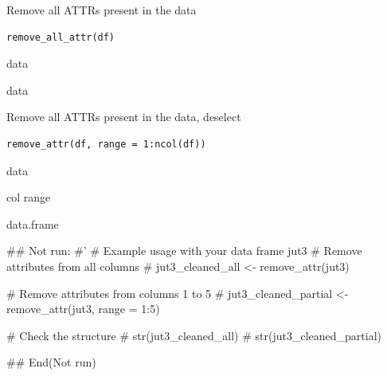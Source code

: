 \documentclass[a4paper]{book}
\begin{document}
%
\begin{Description}
Remove all ATTRs present in the data
\end{Description}
%
\begin{Usage}
\begin{verbatim}
remove_all_attr(df)
\end{verbatim}
\end{Usage}
%
\begin{Arguments}
\begin{ldescription}
\item[\code{df}] data
\end{ldescription}
\end{Arguments}
%
\begin{Value}
data
\end{Value}
%
\begin{Description}
Remove all ATTRs present in the data, deselect
\end{Description}
%
\begin{Usage}
\begin{verbatim}
remove_attr(df, range = 1:ncol(df))
\end{verbatim}
\end{Usage}
%
\begin{Arguments}
\begin{ldescription}
\item[\code{df}] data

\item[\code{range}] col range
\end{ldescription}
\end{Arguments}
%
\begin{Value}
data.frame
\end{Value}
%
\begin{Examples}
\begin{ExampleCode}

\#\# Not run: 
#'
# Example usage with your data frame jut3
# Remove attributes from all columns
# jut3_cleaned_all <- remove_attr(jut3)

# Remove attributes from columns 1 to 5
# jut3_cleaned_partial <- remove_attr(jut3, range = 1:5)

# Check the structure
# str(jut3_cleaned_all)
# str(jut3_cleaned_partial)

## End(Not run)


\end{ExampleCode}
\end{Examples}
\end{document}
